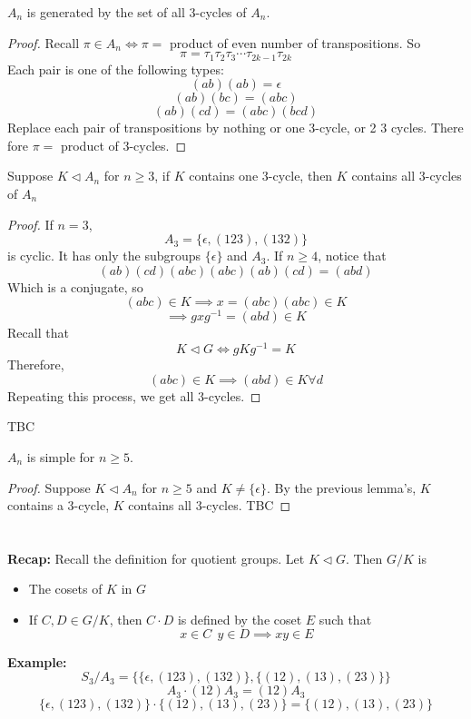 \documentclass[openany]{report}
\begin{document}
\begin{lemma}
    $A_n$ is generated by the set of all 3-cycles of $A_n$.
\end{lemma}
\begin{proof}
    Recall $\pi \in A_n \iff \pi = $ product of even number of transpositions. So 
    $$\pi = \tau_1\tau_2\tau_3\cdots\tau_{2k-1}\tau_{2k}$$ 
    Each pair is one of the following types: 
    \[(ab)(ab) = \epsilon\]
    \[(ab)(bc) = (abc)\]
    \[(ab)(cd) = (abc)(bcd)\]
    Replace each pair of transpositions by nothing or one 3-cycle, or 2 3 cycles. There fore $\pi = $ product of 3-cycles.
\end{proof}

\begin{lemma}
    Suppose $K \triangleleft A_n$ for $n \geq 3$, if $K$ contains one 3-cycle, then $K$ contains all 3-cycles of $A_n$
\end{lemma}

\begin{proof}
    If $n = 3$, 
    \[A_3 = \{\epsilon, (123), (132)\}\]
    is cyclic. It has only the subgroups $\{\epsilon\}$ and $A_3$. If $n \geq 4$, notice that 
    \[(ab)(cd)(abc)(abc)(ab)(cd) = (abd)\]
    Which is a conjugate, so 
    \[(abc) \in K \implies x = (abc)(abc) \in K\]
    \[\implies gxg^{-1} = (abd) \in K\]
    Recall that 
    \[K \triangleleft G \iff gKg^{-1} = K \]
    Therefore,
    \[(abc) \in K \implies (abd) \in K \forall d\]
    Repeating this process, we get all 3-cycles. 
\end{proof}

\begin{lemma}
    TBC
\end{lemma}

\begin{theorem}
    $A_n$ is simple for $n \geq 5$.
\end{theorem}
\begin{proof}
    Suppose $K \triangleleft A_n$ for $n \geq 5$ and $K \neq \{\epsilon\}$. By the previous lemma's, $K$ contains a 3-cycle, $K$ contains all 3-cycles. TBC
\end{proof}

\section{}
\textbf{Recap:} Recall the definition for quotient groups. Let $K \triangleleft G$. Then $G/K$ is 
\begin{itemize}
    \item The cosets of $K$ in $G$
    \item If $C,D \in G/K$, then $C \cdot D$ is defined by the coset $E$ such that 
    \[x\in C \ \ y \in D \implies xy \in E\] 
\end{itemize}
\textbf{Example:}
\[S_3/ A_3 = \{\{\epsilon, (123), (132)\}, \{(12),(13),(23)\}\}\]
\[A_3 \cdot (12) A_3 = (12)A_3\]
\[\{\epsilon, (123), (132)\} \cdot \{(12),(13),(23)\} = \{(12),(13), (23)\}\]
\end{document}
